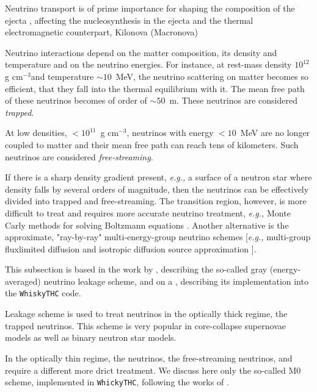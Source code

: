 \documentclass[11pt,a4paper,headinclude=true,DIV=14,BCOR=8mm,chapterprefix,listof=totoc,twoside,openright,abstracton]{scrbook}
\newcommand{\gcm}{g cm$^{-3}$}
\begin{document}
Neutrino transport is of prime importance for shaping the composition of the ejecta
\cite{Wanajo:2014,Sekiguchi:2015dma,Foucart:2015vpa,Foucart:2015gaa},
affecting the nucleosynthesis in the ejecta \cite{Wanajo:2014,Goriely:2015fqa} and the thermal
electromagnetic counterpart, Kilonova (Macronova) \cite{Metzger:2014ila,Lippuner:2015gwa}

Neutrino interactions depend on the matter composition, its density and temperature and on the neutrino energies. For instance, at rest-mass density $10^{12}$\gcm and temperature $\sim10$~MeV, the neutrino scattering on matter becomes so efficient, that they fall into the thermal equilibrium with it. 
The mean free path of these neutrinos becomes of order of $\sim 50$~m. 
These neutrinos are considered \textit{trapped}.

At low densities, $<10^{11}$~\gcm, neutrinos with energy $<10$~MeV are no longer coupled to matter and their mean free path can reach tens of kilometers. Such neutrinos are considered \textit{free-streaming}.

If there is a sharp density gradient present, \textit{e.g.,} a surface of a neutron star where density falls by several orders of magnitude, then the neutrinos can be effectively divided into trapped and free-streaming. 
The transition region, however, is more difficult to treat and requires more accurate neutrino treatment, \textit{e.g.,} Monte Carly methods for solving Boltzmann equations \cite{Abdikamalov:2012zi}. Another alternative is the approximate, "ray-by-ray" \cite{Scheck:2007gw} multi-energy-group neutrino schemes [\textit{e.g.,} multi-group fluxlimited diffusion \cite{Mezzacappa:1993gn} and isotropic diffusion source approximation \cite{Liebendoerfer:2007dz}].

This subsection is based in the work by \cite{Galeazzi:2013mia}, describing the so-called 
gray (energy-averaged) neutrino leakage scheme, and on a \cite{Radice:2016dwd,Radice:2018pdn}, describing its implementation into the \texttt{WhiskyTHC} code. 

Leakage scheme is used to treat neutrinos in the optically thick regime, the trapped neutrinos.
This scheme is very popular in core-collapse supernovae models as well as binary neutron star models.
\cite{vanRiper:1981mko,Ruffert:1995fs,Rosswog:2003rv,OConnor:2009iuz,Perego:2015agy}

In the optically thin regime, the neutrinos, the free-streaming neutrinos, and require a different more drict treatment. 
We discuss here only the so-called M0 scheme, implemented in \texttt{WhickyTHC}, following the works of \cite{Radice:2016dwd,Radice:2018pdn}.
\end{document}
